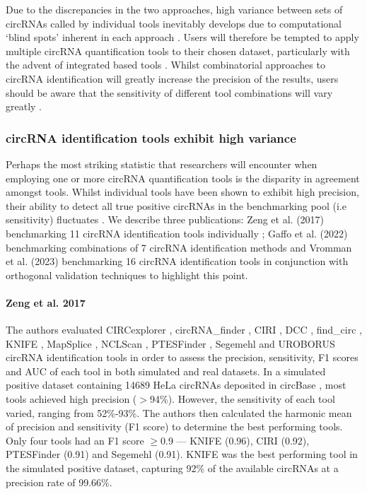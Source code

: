 Due to the discrepancies in the two approaches, high variance between sets of circRNAs called by individual tools inevitably develops due to computational `blind spots' inherent in each approach \cite{Szabo2016Oct}. Users will therefore be tempted to apply multiple circRNA quantification tools to their chosen dataset, particularly with the advent of integrated based tools \cite{RAISE,CirComPara,CirComPara2,Digby2023Dec,circRNAwrap}. Whilst combinatorial approaches to circRNA identification will greatly increase the precision of the results, users should be aware that the sensitivity of different tool combinations will vary greatly \cite{Hansen2016Apr,Szabo2016Oct,Hansen2018,Zeng2017Jun,Vromman2023Aug}.

\subsubsection{circRNA identification tools exhibit high variance}
Perhaps the most striking statistic that researchers will encounter when employing one or more circRNA quantification tools is the disparity in agreement amongst tools. Whilst individual tools have been shown to exhibit high precision, their ability to detect all true positive circRNAs in the benchmarking pool (i.e sensitivity) fluctuates \cite{Vromman2023Aug,Zeng2017Jun}. We describe three publications: Zeng et al. (2017) benchmarking 11 circRNA identification tools individually \cite{Zeng2017Jun}; Gaffo et al. (2022) benchmarking combinations of 7 circRNA identification methods \cite{CirComPara2} and Vromman et al. (2023) benchmarking 16 circRNA identification tools in conjunction with orthogonal validation techniques \cite{Vromman2023Aug} to highlight this point. \par

\paragraph*{Zeng et al. 2017}
The authors evaluated CIRCexplorer \cite{CIRCexplorer}, circRNA\_finder \cite{circRNAfinder}, CIRI \cite{CIRI}, DCC \cite{DCC}, find\_circ \cite{findcirc}, KNIFE \cite{KNIFE}, MapSplice \cite{MapSplice}, NCLScan \cite{NCLscan}, PTESFinder \cite{PTESfinder}, Segemehl \cite{segemehl} and UROBORUS \cite{UROBORUS} circRNA identification tools in order to assess the precision, sensitivity, F1 scores and AUC of each tool in both simulated and real datasets. In a simulated positive dataset containing 14689 HeLa circRNAs deposited in circBase \cite{circbase}, most tools achieved high precision ($>$94\%). However, the sensitivity of each tool varied, ranging from 52\%-93\%. The authors then calculated the harmonic mean of precision and sensitivity (F1 score) to determine the best performing tools. Only four tools had an F1 score $\geq$0.9 --- KNIFE (0.96), CIRI (0.92), PTESFinder (0.91) and Segemehl (0.91). KNIFE was the best performing tool in the simulated positive dataset, capturing 92\% of the available circRNAs at a precision rate of 99.66\%. \par

